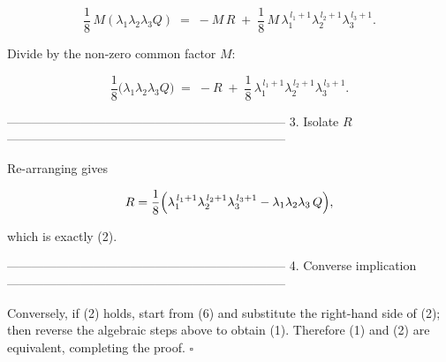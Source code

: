 \[
\frac18\,M(\lambda _1\lambda _2\lambda _3Q)
   \;=\;
   -M\,R
   \;+\;
   \frac18\,M\,
         \lambda _1^{\,l_{1}+1}\lambda _2^{\,l_{2}+1}\lambda _3^{\,l_{3}+1}.
\]

Divide by the non-zero common factor $M$:

\[
\frac18\bigl(\lambda _1\lambda _2\lambda _3Q\bigr)
   \;=\;
   -R
   \;+\;
   \frac18\,
        \lambda _1^{\,l_{1}+1}\lambda _2^{\,l_{2}+1}\lambda _3^{\,l_{3}+1}.
\]

--------------------------------------------------------------------
3.  Isolate $R$
--------------------------------------------------------------------

Re-arranging gives

\[
R=\frac18\Bigl(\lambda _1^{\,l_{1}+1}\lambda _2^{\,l_{2}+1}\lambda _3^{\,l_{3}+1}
               -\lambda _1\lambda _2\lambda _3\,Q\Bigr),
\]

which is exactly (2).

--------------------------------------------------------------------
4.  Converse implication
--------------------------------------------------------------------

Conversely, if (2) holds, start from (6) and substitute the right-hand side of (2); then reverse the algebraic steps above to obtain (1). Therefore (1) and (2) are equivalent, completing the proof. $\square$